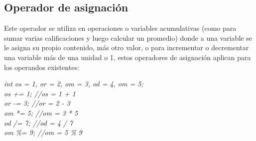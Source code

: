 \subsection{Operador de asignación}
Este operador se utiliza en operaciones o variables acumulativas (como para sumar varias calificaciones y luego calcular un promedio) donde a una variable se le asigna su propio contenido, más otro valor, o para incrementar o decrementar una variable más de una unidad o 1, estos operadores de asignación aplican para los operandos existentes:
\begin{center}
    \textit{int os = 1, or = 2, om = 3, od = 4, om = 5;\\os += 1; //os = 1 + 1\\or -= 3; //or = 2 - 3\\om *= 5; //om = 3 * 5\\od /= 7; //od = 4 / 7\\om \%= 9; //om = 5 \% 9}
\end{center}




